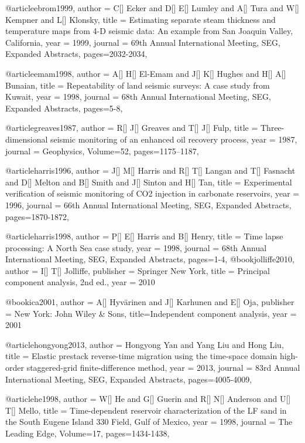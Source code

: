 @article{ebrom1999,
  author =	 {C[] Ecker and D[] E[] Lumley and A[] Tura and W[] Kempner and L[] Klonsky},
  title =	 {Estimating separate steam thickness and temperature maps from 4-D seismic data: An example from San Joaquin Valley, California},
  year =	 1999,
  journal =	 {69th Annual International Meeting, SEG, Expanded Abstracts},
 pages=2032-2034,
}

@article{emam1998,
  author =	 {A[] H[] El-Emam and J[] K[] Hughes and H[] A[] Bunaian},
  title =	 {Repeatability of land seismic surveys: A case study from Kuwait},
  year =	 1998,
  journal =	 {68th Annual International Meeting, SEG, Expanded Abstracts},
 pages=5-8,
}


@article{greaves1987,
  author =	 {R[] J[] Greaves and T[] J[] Fulp},
  title =	 {Three-dimensional seismic monitoring of an enhanced oil recovery process},
  year =	 1987,
  journal =	 {Geophysics},
    Volume=52,
 pages=1175–1187,
}

@article{harris1996,
  author =	 {J[] M[] Harris and R[] T[] Langan and T[] Fasnacht and D[] Melton and B[] Smith and J[] Sinton and H[] Tan},
  title =	 {Experimental verification of seismic monitoring of CO2 injection in carbonate reservoirs},
  year =	 1996,
  journal =	 {66th Annual International Meeting, SEG, Expanded Abstracts},
 pages=1870-1872,
}

@article{harris1998,
  author =	 {P[] E[] Harris and B[] Henry},
  title =	 {Time lapse processing: A North Sea case study},
  year =	 1998,
  journal =	 {68th Annual International Meeting, SEG, Expanded Abstracts},
 pages=1-4,
}
@book{jolliffe2010,
   author =       {I[] T[] Jolliffe},
   publisher =    {Springer New York},
   title =        {Principal component analysis, 2nd ed.},
   year =         {2010}
}

@book{ica2001,
   author =       {A[] Hyv\"{a}rinen  and J[] Karhunen and E[] Oja},
   publisher =    {New York: John Wiley \& Sons},
   title={Independent component analysis},
   year =         {2001}
}


@article{hongyong2013,
  author =	 {Hongyong Yan and Yang Liu and Hong Liu},
  title =	 {Elastic prestack reverse-time migration using the time-space domain high-order staggered-grid finite-difference method},
  year =	 2013,
  journal =	 {83rd Annual International Meeting, SEG, Expanded Abstracts},
 pages=4005-4009,
}

@article{he1998,
  author =	 {W[] He and G[] Guerin and R[] N[] Anderson and U[] T[] Mello},
  title =	 {Time-dependent reservoir characterization of the LF sand in the South Eugene Island 330 Field, Gulf of Mexico},
  year =	 1998,
  journal =	 {The Leading Edge},
    Volume=17,
 pages=1434-1438,
}

